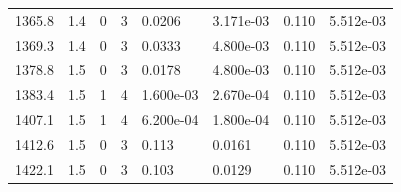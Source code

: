 \documentclass[preview]{standalone}
\begin{document}
{{{{{\begin{tabular}{L{1.2cm}C{1.2cm} C{0.3cm}C{0.5cm} C{1.4cm}C{1.4cm} C{1.4cm}C{1.4cm}}
  1365.8  &   1.4  & 0     &  3 &  0.0206  & 3.171e-03  & 0.110 &  5.512e-03   \\ 
  1369.3  &   1.4  & 0     &  3 &  0.0333  & 4.800e-03  & 0.110 &  5.512e-03   \\ 
  1378.8  &   1.5  & 0     &  3 &  0.0178  & 4.800e-03  & 0.110 &  5.512e-03   \\ 
  1383.4  &   1.5  & 1     &  4 &  1.600e-03  & 2.670e-04  & 0.110 &  5.512e-03   \\ 
  1407.1  &   1.5  & 1     &  4 &  6.200e-04  & 1.800e-04  & 0.110 &  5.512e-03   \\ 
  1412.6  &   1.5  & 0     &  3 &  0.113  & 0.0161  & 0.110 &  5.512e-03   \\ 
  1422.1  &   1.5  & 0     &  3 &  0.103  & 0.0129  & 0.110 &  5.512e-03   \\ 
\hline 
\end{tabular} 

}}}}}
\end{document}
